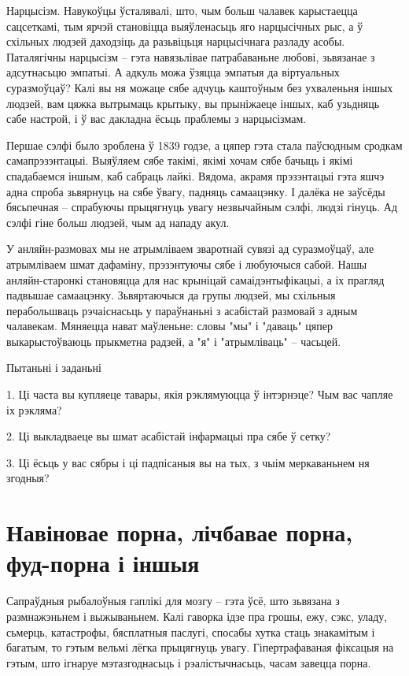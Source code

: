 Нарцысізм. Навукоўцы ўсталявалі, што, чым больш чалавек карыстаецца сацсеткамі, тым ярчэй становіцца выяўленасьць яго нарцысічных рыс, а ў схільных людзей даходзіць да разьвіцьця нарцысічнага разладу асобы. Паталягічны нарцысізм – гэта навязьлівае патрабаваньне любові, зьвязанае з адсутнасьцю эмпатыі. А адкуль можа ўзяцца эмпатыя да віртуальных суразмоўцаў? Калі вы ня можаце сябе адчуць каштоўным без ухваленьня іншых людзей, вам цяжка вытрымаць крытыку, вы прыніжаеце іншых, каб узьдняць сабе настрой, і ў вас дакладна ёсьць праблемы з нарцысізмам.

Першае сэлфі было зроблена ў 1839 годзе, а цяпер гэта стала паўсюдным сродкам самапрэзэнтацыі. Выяўляем сябе такімі, якімі хочам сябе бачыць і якімі спадабаемся іншым, каб сабраць лайкі. Вядома, акрамя прэзэнтацыі гэта яшчэ адна спроба зьвярнуць на сябе ўвагу, падняць самаацэнку. І далёка не заўсёды бясьпечная – спрабуючы прыцягнуць увагу незвычайным сэлфі, людзі гінуць. Ад сэлфі гіне больш людзей, чым ад нападу акул.

У анляйн-размовах мы не атрымліваем зваротнай сувязі ад суразмоўцаў, але атрымліваем шмат дафаміну, прэзэнтуючы сябе і любуючыся сабой. Нашы анляйн-старонкі становяцца для нас крыніцай самаідэнтыфікацыі, а іх прагляд падвышае самаацэнку. Зьвяртаючыся да групы людзей, мы схільныя перабольшваць рэчаіснасьць у параўнаньні з асабістай размовай з адным чалавекам. Мяняецца нават маўленьне: словы "мы" і "даваць" цяпер выкарыстоўваюць прыкметна радзей, а "я" і "атрымліваць" – часьцей.

Пытаньні і заданьні

1. Ці часта вы купляеце тавары, якія рэклямуюцца ў інтэрнэце? Чым вас чапляе іх рэкляма?

2. Ці выкладваеце вы шмат асабістай інфармацыі пра сябе ў сетку?

3. Ці ёсьць у вас сябры і ці падпісаныя вы на тых, з чыім меркаваньнем ня згодныя?


\section{Навіновае порна, лічбавае порна, фуд-порна і іншыя}

Сапраўдныя рыбалоўныя гаплікі для мозгу – гэта ўсё, што зьвязана з размнажэньнем і выжываньнем. Калі гаворка ідзе пра грошы, ежу, сэкс, уладу, сьмерць, катастрофы, бясплатныя паслугі, спосабы хутка стаць знакамітым і багатым, то гэтым вельмі лёгка прыцягнуць увагу. Гіпертрафаваная фіксацыя на гэтым, што ігнаруе мэтазгоднасьць і рэалістычнасьць, часам завецца порна.


